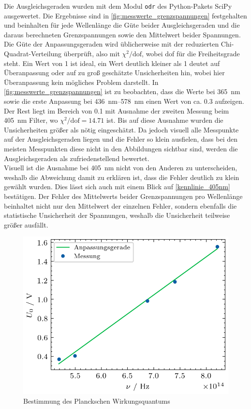 Die Ausgleichsgeraden wurden mit dem Modul \verb|odr| des Python-Pakets SciPy\cite{scipy:odr}
ausgewertet. Die Ergebnisse sind in \cref{fig:messwerte_grenzspannungen} festgehalten
und beinhalten für jede Wellenlänge die Güte beider Ausgleichsgeraden und die daraus berechneten
Grenzspannungen sowie den Mittelwert beider Spannungen. \\

Die Güte der Anpassungsgeraden
wird üblicherweise mit der reduzierten Chi-Quadrat-Verteilung\cite{wiki:reduced_chi_square} überprüft, also mit
$\chi^2 / \mathrm{dof}$, wobei dof für die Freiheitsgrade steht. Ein Wert von 1 ist ideal,
ein Wert deutlich kleiner als 1 deutet auf Überanpassung oder auf zu groß geschätzte
Unsicherheiten hin, wobei hier Überanpassung kein mögliches Problem darstellt.
In \cref{fig:messwerte_grenzspannungen} ist zu beobachten, dass die Werte bei \SI{365}{\nano\meter}
sowie die erste Anpassung bei \qtyrange{436}{578}{\nano\meter} einen Wert von ca. \num{0.3}
aufzeigen. Der Rest liegt im Bereich von \num{0.1} mit Ausnahme der zweiten Messung beim
\SI{405}{\nano\meter} Filter, wo $\chi^2/\mathrm{dof} = \num{14.71}$ ist. Bis
auf diese Ausnahme wurden die Unsicherheiten größer als nötig eingeschätzt. Da jedoch
visuell alle Messpunkte auf der Ausgleichsgeraden liegen und die Fehler so klein ausfielen, dass
bei den meisten Messpunkten diese nicht in den Abbildungen sichtbar sind, werden die
Ausgleichsgeraden als zufriedenstellend bewertet. \\

Visuell ist die Ausnahme
bei \SI{405}{\nano\meter} nicht von den Anderen zu unterscheiden, weshalb die Abweichung
damit zu erklären ist, dass die Fehler deutlich zu klein gewählt wurden.
Dies lässt sich auch mit einem Blick auf \cref{kennlinie_405nm} bestätigen.
Der Fehler des Mittelwerts beider Grenzspannungen pro Wellenlänge beinhaltet
nicht nur den Mittelwert der einzelnen Fehler, sondern ebenfalls die statistische Unsicherheit
der Spannungen, weshalb die Unsicherheit teilweise größer ausfällt.\\

\begin{figure}[htb]
	\centering
	\includegraphics[width=0.75\linewidth]{../figs/photozelle_wirkungsquantum.png}
	\caption{Bestimmung des Planckschen Wirkungsquantums}
	\label{fig:bestimmung_planck}
\end{figure}

